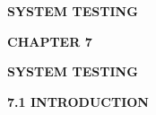 \vspace*{\fill}
\begin{center}
  {\fontsize{18pt}{24pt}\selectfont\bfseries SYSTEM TESTING\par}
\end{center}
\vspace*{\fill}
\newpage

\begin{center}
  {\fontsize{16pt}{20pt}\selectfont\bfseries CHAPTER 7\par}
  \vspace{0.3cm}
  {\fontsize{16pt}{20pt}\selectfont\bfseries SYSTEM TESTING\par}
\end{center}
\vspace{0.4cm}

{\fontsize{14pt}{18pt}\selectfont\bfseries 7.1 INTRODUCTION\par}
\vspace{0.2cm}

